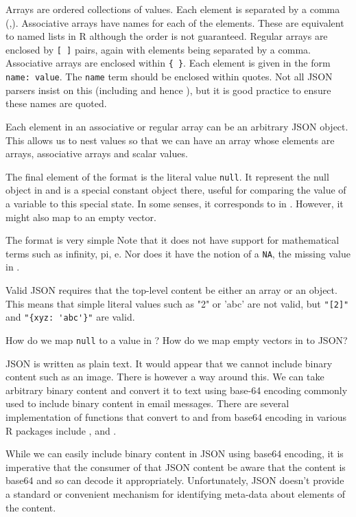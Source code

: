 \documentclass[article]{jss}
\begin{document}
Arrays are ordered collections of values.
Each element is separated by a comma (,).
Associative arrays have names for each of the elements.
These are equivalent to named lists in R although the order
is not guaranteed.
Regular arrays are enclosed by \verb+[ ]+ pairs,
again with elements being separated by a comma.
Associative arrays are enclosed within \verb+{ }+.
Each element is given in the form \verb+name: value+.
The \verb+name+ term should be enclosed within quotes.
Not all JSON parsers insist on this (including 
and hence ), but it is good practice
to ensure these names are quoted.

Each element in an associative or regular  array can be an arbitrary 
JSON object. This allows us to nest values so that we can have
an array whose elements are arrays, associative arrays and scalar values.

The final element of the format is the literal value \verb+null+.
It represent the null object in  and is a special constant object there,
useful for comparing the value of a variable to this special state.
In some senses, it corresponds to \Snull{} in . 
However, it might also map to an empty vector.

The format is very simple Note that it does not have support for 
mathematical terms such as infinity, pi, e.
Nor does it have the notion of a \texttt{NA}, the missing value in .

Valid JSON requires that the top-level content be either
an array or an object. This means that simple literal values
such as "2" or 'abc' are not valid, but
\verb+"[2]"+ and \verb+"{xyz: 'abc'}"+ are valid.

How do we map \verb+null+ to a value in ?
How do we map empty vectors in  to JSON?

JSON is written as plain text. It would appear that we cannot
include binary content such as an image.
There is however a way around this. We can take arbitrary
binary content and convert it to text using base-64 encoding
commonly used to include binary content in email messages.
There are several implementation of functions 
that convert to and from base64 encoding in various R packages
include , 
and . 

While we can easily include binary content in JSON using
base64 encoding, it is imperative that the consumer
of that JSON content be aware that the content is base64
and so can decode it appropriately.  Unfortunately, 
JSON doesn't provide a standard or convenient mechanism for identifying
meta-data about elements of the content.
\end{document}
